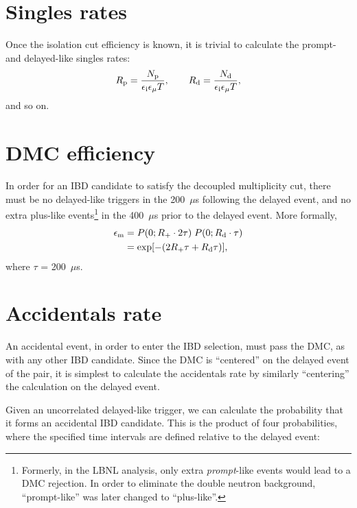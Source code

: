 \documentclass[../thesis.tex]{subfiles}
\begin{document}
\section{Singles rates}
\label{sec:singratescalc}

Once the isolation cut efficiency is known, it is trivial to calculate the prompt- and delayed-like singles rates:
\begin{equation}
  R_\mathrm{p} = \frac{N_\mathrm{p}}{\epsilon_\mathrm{i} \epsilon_\mathrm{\mu} T},\qquad
  R_\mathrm{d} = \frac{N_\mathrm{d}}{\epsilon_\mathrm{i} \epsilon_\mathrm{\mu} T},
\end{equation}
and so on.

\section{DMC efficiency}
\label{sec:dmceffcalc}

\def\edmc{\ensuremath{\epsilon_\mathrm{m}}}

In order for an IBD candidate to satisfy the decoupled multiplicity cut, there must be no delayed-like triggers in the 200~$\mu$s following the delayed event, and no extra plus-like events\footnote{Formerly, in the LBNL analysis, only extra \emph{prompt}-like events would lead to a DMC rejection. In order to eliminate the double neutron background, ``prompt-like'' was later changed to ``plus-like''.} in the 400~$\mu$s prior to the delayed event. More formally,
\begin{align}
  \edmc &= P(0; \Rplu \cdot 2\tau)\;P(0; \Rdel \cdot \tau) \nonumber \\
        &= \exp [-(2\Rplu\tau + \Rdel\tau)],
\end{align}
where $\tau$ = 200~$\mu$s.

\section{Accidentals rate}
\label{sec:accratecalc}

An accidental event, in order to enter the IBD selection, must pass the DMC, as with any other IBD candidate. Since the DMC is ``centered'' on the delayed event of the pair, it is simplest to calculate the accidentals rate by similarly ``centering'' the calculation on the delayed event.

Given an uncorrelated delayed-like trigger, we can calculate the probability that it forms an accidental IBD candidate. This is the product of four probabilities, where the specified time intervals are defined relative to the delayed event:
\end{document}
